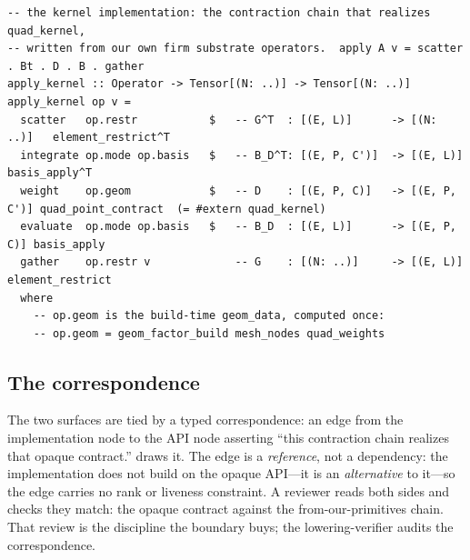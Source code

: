 \begin{lstlisting}[style=l4style]
-- the kernel implementation: the contraction chain that realizes quad_kernel,
-- written from our own firm substrate operators.  apply A v = scatter . Bt . D . B . gather
apply_kernel :: Operator -> Tensor[(N: ..)] -> Tensor[(N: ..)]
apply_kernel op v =
  scatter   op.restr           $   -- G^T  : [(E, L)]      -> [(N: ..)]   element_restrict^T
  integrate op.mode op.basis   $   -- B_D^T: [(E, P, C')]  -> [(E, L)]    basis_apply^T
  weight    op.geom            $   -- D    : [(E, P, C)]   -> [(E, P, C')] quad_point_contract  (= #extern quad_kernel)
  evaluate  op.mode op.basis   $   -- B_D  : [(E, L)]      -> [(E, P, C)] basis_apply
  gather    op.restr v             -- G    : [(N: ..)]     -> [(E, L)]    element_restrict
  where
    -- op.geom is the build-time geom_data, computed once:
    -- op.geom = geom_factor_build mesh_nodes quad_weights
\end{lstlisting}

\subsection{The correspondence}

The two surfaces are tied by a typed \emph{}
correspondence: an edge from the implementation node to the API node asserting
``this contraction chain realizes that opaque contract.'' 
draws it. The edge is a \emph{reference}, not a dependency: the implementation does
not build on the opaque API---it is an \emph{alternative} to it---so the edge
carries no rank or liveness constraint. A reviewer reads both sides and checks they
match: the opaque  contract against the from-our-primitives chain.
That review is the discipline the boundary buys; the lowering-verifier audits the
correspondence.


